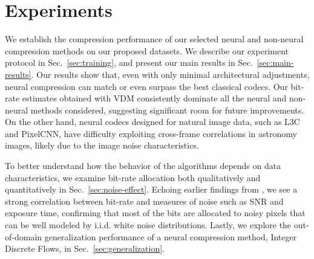 
\section{Experiments}\label{sec:experiments}
We establish the compression performance of our selected neural and non-neural compression methods on our proposed datasets.
We describe our experiment protocol in Sec.~\ref{sec:training}, and present our main results in Sec.~\ref{sec:main-results}. Our results show that, even with only minimal architectural adjustments, neural compression can match or even surpass the best classical codecs. 
Our bit-rate estimates obtained with VDM \citep{kingma2021variational} consistently dominate all the neural and non-neural methods considered, suggesting significant room for future improvements.
On the other hand, neural codecs designed for natural image data, such as L3C and PixelCNN, have difficulty exploiting cross-frame correlations in astronomy images, likely due to the image noise characteristics. 


To better understand how the behavior of the algorithms depends on data characteristics, we examine bit-rate allocation both qualitatively and quantitatively in Sec.~\ref{sec:noise-effect}. Echoing earlier findings from \citet{pence2009lossless}, we see a strong correlation between bit-rate and measures of noise such as SNR and exposure time, confirming that most of the bits are allocated to noisy pixels that can be well modeled by i.i.d. white noise distributions.  Lastly, we explore the out-of-domain generalization performance of a neural compression method, Integer Discrete Flows, in Sec.~\ref{sec:generalization}.


